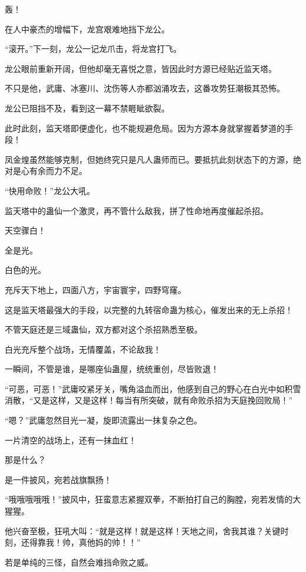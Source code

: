 
\begin{this_body}

轰！

在人中豪杰的增幅下，龙宫艰难地挡下龙公。

“滚开。”下一刻，龙公一记龙爪击，将龙宫打飞。

龙公眼前重新开阔，但他却毫无喜悦之意，皆因此时方源已经贴近监天塔。

不只是他，武庸、冰塞川、沈伤等人亦都汹涌攻去，这番攻势狂潮极其恐怖。

龙公已阻挡不及，看到这一幕不禁睚眦欲裂。

此时此刻，监天塔即便虚化，也不能规避危局。因为方源本身就掌握着梦道的手段！

凤金煌虽然能够克制，但她终究只是凡人蛊师而已。要抵抗此刻状态下的方源，绝对是心有余而力不足。

“快用命败！”龙公大吼。

监天塔中的蛊仙一个激灵，再不管什么敌我，拼了性命地再度催起杀招。

天空骤白！

全是光。

白色的光。

充斥天下地上，四面八方，宇宙寰宇，四野穹窿。

这是监天塔最强大的手段，以完整的九转宿命蛊为核心，催发出来的无上杀招！

不管天庭还是三域蛊仙，双方都对这个杀招熟悉至极。

白光充斥整个战场，无情覆盖，不论敌我！

一瞬间，不管是谁，是哪座仙蛊屋，统统重创，尽皆败退！

“可恶，可恶！”武庸咬紧牙关，嘴角溢血而出，他感到自己的野心在白光中如积雪消散，“又是这样，又是这样！每当有所突破，就有命败杀招为天庭挽回败局！”

“嗯？”武庸忽然目光一凝，旋即流露出一抹复杂之色。

一片清空的战场上，还有一抹血红！

那是什么？

是一件披风，宛若战旗飘扬！

“哦哦哦哦哦！”披风中，狂蛮意志紧握双拳，不断拍打自己的胸膛，宛若发情的大猩猩。

他兴奋至极，狂吼大叫：“就是这样！就是这样！天地之间，舍我其谁？关键时刻，还得靠我！帅，真他妈的帅！！”

若是单纯的三怪，自然会难挡命败之威。


\end{this_body}
